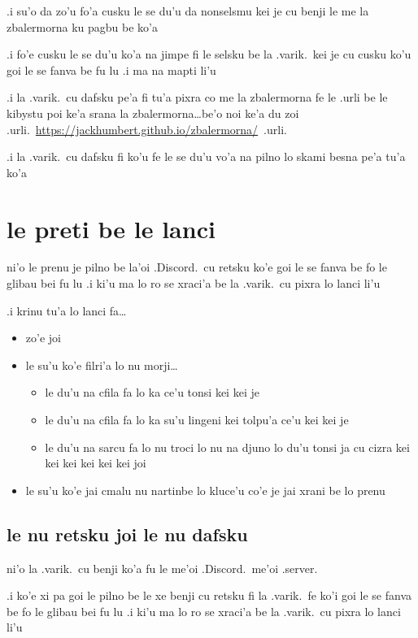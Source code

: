 \documentclass{report}
\begin{document}
.i su'o da zo'u fo'a cusku le se du'u da nonselsmu kei je cu benji le me la zbalermorna ku pagbu be ko'a

.i fo'e cusku le se du'u ko'a na jimpe fi le selsku be la .varik.\ kei je cu cusku ko'u goi le se fanva be fu lu .i ma na mapti li'u

.i la .varik.\ cu dafsku pe'a fi tu'a pixra co me la zbalermorna fe le .urli be le kibystu poi ke'a srana la zbalermorna\ldots be'o noi ke'a du zoi .urli.\ \url{https://jackhumbert.github.io/zbalermorna/}\ .urli.

.i la .varik.\ cu dafsku fi ko'u fe le se du'u vo'a na pilno lo skami besna pe'a tu'a ko'a

\section{le preti be le lanci}
ni'o le prenu je pilno be la'oi .Discord.\ cu retsku ko'e goi le se fanva be fo le glibau bei fu lu .i ki'u ma lo ro se xraci'a be la .varik.\ cu pixra lo lanci li'u

.i krinu tu'a lo lanci fa\ldots

\begin{itemize}
	\item zo'e joi
	\item le su'u ko'e filri'a lo nu morji\ldots
	\begin{itemize}
		\item le du'u na cfila fa lo ka ce'u tonsi kei kei je
		\item le du'u na cfila fa lo ka su'u lingeni kei tolpu'a ce'u kei kei je
		\item le du'u na sarcu fa lo nu troci lo nu na djuno lo du'u tonsi ja cu cizra kei kei kei kei kei kei joi
	\end{itemize}
	\item le su'u ko'e jai cmalu nu nartinbe lo kluce'u co'e je jai xrani be lo prenu
\end{itemize}

\subsection{le nu retsku joi le nu dafsku}
ni'o la .varik.\ cu benji ko'a fu le me'oi .Discord.\ me'oi .server.

.i ko'e xi pa goi le pilno be le xe benji cu retsku fi la .varik.\ fe ko'i goi le se fanva be fo le glibau bei fu lu .i ki'u ma lo ro se xraci'a be la .varik.\ cu pixra lo lanci li'u
\end{document}
